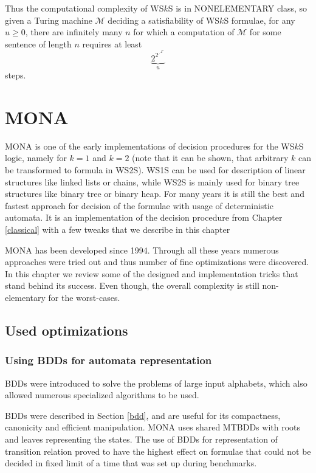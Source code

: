 Thus the computational complexity of WS$k$S is in NONELEMENTARY class, so given
a Turing machine $\mathcal{M}$ deciding a satisfiability of WS$k$S formulae, for
any $u \geq 0$, there are infinitely many $n$ for which a computation of
$\mathcal{M}$ for some sentence of length $n$ requires at least
$$\underbrace{2^{2^{\iddots^{2^n}}}}_u$$ steps.
	
\chapter{\textsc{MONA}}\label{monachap}

 \textsc{MONA} \cite{mona} is one of the early implementations of decision
 procedures for the WS$k$S logic, namely for $k = 1$ and $k = 2$ (note that it
 can be shown, that arbitrary $k$ can be transformed to formula in WS2S). WS1S
 can be used for description of linear structures like linked lists or chains,
 while WS2S is mainly used for binary tree structures like binary tree or binary
 heap. For many years it is still the best and fastest approach for decision of
 the formulae with usage of deterministic automata. It is an implementation of
 the decision procedure from Chapter \ref{classical} with a few tweaks that we
 describe in this chapter

\textsc{MONA} has been developed since 1994. Through all these years numerous
approaches were tried out and thus number of fine optimizations were discovered.
In this chapter we review some of the designed and implementation tricks that
stand behind its success. Even though, the overall complexity is still
non-elementary for the worst-cases.

 \section{Used optimizations}\label{monasecrets}
\subsection{Using BDDs for automata representation}\label{monabdd}
BDDs were introduced to solve the problems of large input alphabets, which also
allowed numerous specialized algorithms to be used.

BDDs were described in Section \ref{bdd}, and are useful for its compactness,
canonicity and efficient manipulation. \textsc{MONA} uses shared MTBDDs with
roots and leaves representing the states. The use of BDDs for representation  of
transition relation proved to have the highest effect on formulae that could not
be decided in fixed limit of a time that was set up during benchmarks.

